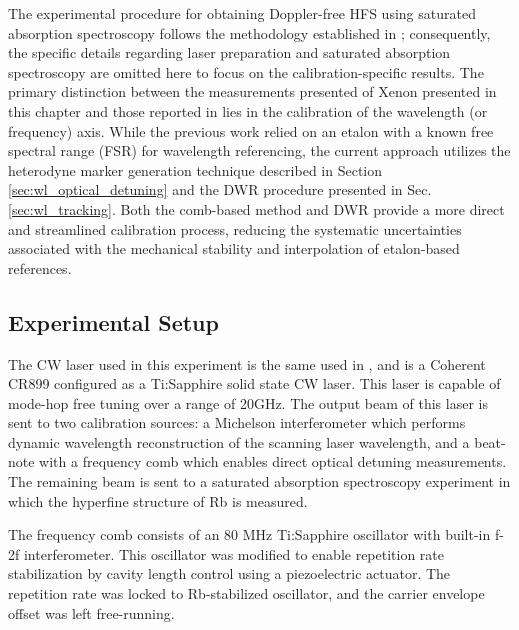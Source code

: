 \documentclass[12pt]{report}
\begin{document}
	The experimental procedure for obtaining Doppler-free HFS using saturated absorption spectroscopy follows the methodology established in \cite{ours_xe_paper}; consequently, the specific details regarding laser preparation and saturated absorption spectroscopy are omitted here to focus on the calibration-specific results. The primary distinction between the measurements presented of Xenon presented in this chapter and those reported in \cite{ours_xe_paper} lies in the calibration of the wavelength (or frequency) axis. While the previous work relied on an etalon with a known free spectral range (FSR) for wavelength referencing, the current approach utilizes the heterodyne marker generation technique described in Section \ref{sec:wl_optical_detuning} and the DWR procedure presented in Sec. \ref{sec:wl_tracking}. Both the comb-based method and DWR provide a more direct and streamlined calibration process, reducing the systematic uncertainties associated with the mechanical stability and interpolation of etalon-based references.
	
	\subsection{Experimental Setup}
	
	The CW laser used in this experiment is the same used in \cite{ours_xe_paper}, and is a Coherent CR899 configured as a Ti:Sapphire solid state CW laser. This laser is capable of mode-hop free tuning over a range of 20GHz. The output beam of this laser is sent to two calibration sources: a Michelson interferometer which performs dynamic wavelength reconstruction of the scanning laser wavelength, and a beat-note with a frequency comb which enables direct optical detuning measurements. The remaining beam is sent to a saturated absorption spectroscopy experiment in which the hyperfine structure of Rb is measured.
	
	The frequency comb consists of an 80 MHz Ti:Sapphire oscillator with built-in f-2f interferometer. This oscillator was modified to enable repetition rate stabilization by cavity length control using a piezoelectric actuator. The repetition rate was locked to Rb-stabilized oscillator, and the carrier envelope offset was left free-running.
	
	
\end{document}
